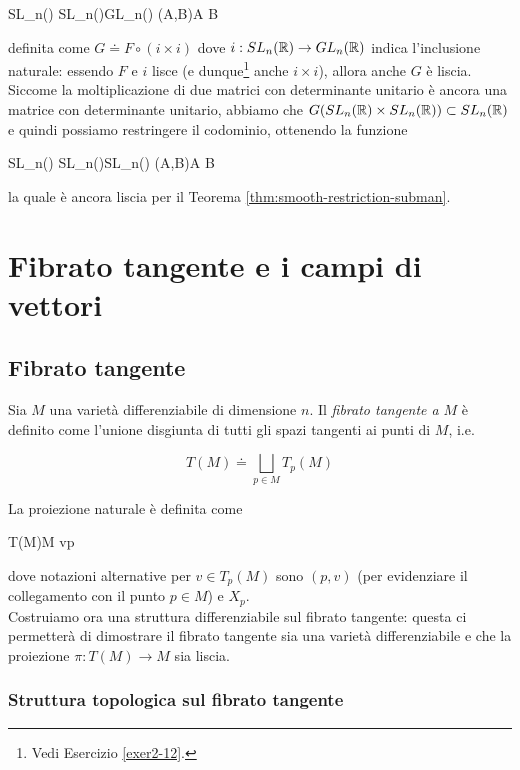 	{SL_{n}(\R) \times SL_{n}(\R)}{GL_{n}(\R)}
	{(A,B)}{A B}

definita come $ G \doteq F \circ (i \times i) $ dove $ i : SL_{n}(\mathbb{R}) \to GL_{n}(\mathbb{R}) $ indica l'inclusione naturale: essendo $ F $ e $ i $ lisce (e dunque\footnote{%
	Vedi Esercizio \ref{exer2-12}.%
} anche $ i \times i $), allora anche $ G $ è liscia. \\
Siccome la moltiplicazione di due matrici con determinante unitario è ancora una matrice con determinante unitario, abbiamo che $ G(SL_{n}(\mathbb{R}) \times SL_{n}(\mathbb{R})) \subset SL_{n}(\mathbb{R}) $ e quindi possiamo restringere il codominio, ottenendo la funzione

\map{\mu}
	{SL_{n}(\R) \times SL_{n}(\R)}{SL_{n}(\R)}
	{(A,B)}{A B}

la quale è ancora liscia per il Teorema \ref{thm:smooth-restriction-subman}.

\section{Fibrato tangente e i campi di vettori}

\subsection{Fibrato tangente}

Sia $ M $ una varietà differenziabile di dimensione $ n $. Il \textit{fibrato tangente a} $ M $ è definito come l'unione disgiunta di tutti gli spazi tangenti ai punti di $ M $, i.e.

\begin{equation}
	T(M) \doteq \bigsqcup_{p \in M} T_{p}(M)
\end{equation}

La proiezione naturale è definita come

\map{\pi}
	{T(M)}{M}
	{v}{p}

dove notazioni alternative per $ v \in T_{p}(M) $ sono $ (p,v) $ (per evidenziare il collegamento con il punto $ p \in M $) e $ X_{p} $. \\
Costruiamo ora una struttura differenziabile sul fibrato tangente: questa ci permetterà di dimostrare il fibrato tangente sia una varietà differenziabile e che la proiezione $ \pi : T(M) \to M $ sia liscia.

\subsubsection{Struttura topologica sul fibrato tangente}

